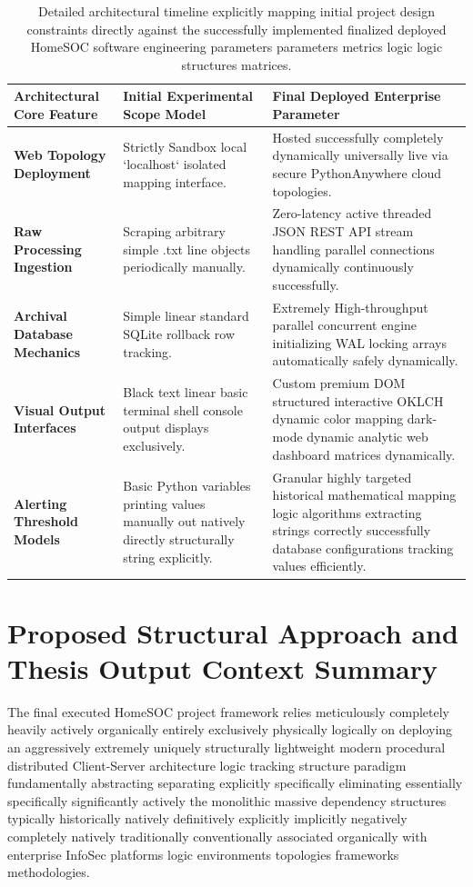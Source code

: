 \begin{table}[h]
\centering
\small
\begin{tabularx}{\textwidth}{|X|p{4cm}|p{4cm}|}
\hline
\textbf{Architectural Core Feature} & \textbf{Initial Experimental Scope Model} & \textbf{Final Deployed Enterprise Parameter} \\ \hline
\textbf{Web Topology Deployment} & Strictly Sandbox local `localhost` isolated mapping interface. & Hosted successfully completely dynamically universally live via secure PythonAnywhere cloud topologies.  \\ \hline
\textbf{Raw Processing Ingestion} & Scraping arbitrary simple .txt line objects periodically manually.  & Zero-latency active threaded JSON REST API stream handling parallel connections dynamically continuously successfully. \\ \hline
\textbf{Archival Database Mechanics} & Simple linear standard SQLite rollback row tracking. & Extremely High-throughput parallel concurrent engine initializing WAL locking arrays automatically safely dynamically. \\ \hline
\textbf{Visual Output Interfaces} & Black text linear basic terminal shell console output displays exclusively. & Custom premium DOM structured interactive OKLCH dynamic color mapping dark-mode dynamic analytic web dashboard matrices dynamically. \\ \hline
\textbf{Alerting Threshold Models} & Basic Python variables printing values manually out natively directly structurally string explicitly. & Granular highly targeted historical mathematical mapping logic algorithms extracting strings correctly successfully database configurations tracking values efficiently. \\ \hline
\end{tabularx}
\caption{Detailed architectural timeline explicitly mapping initial project design constraints directly against the successfully implemented finalized deployed HomeSOC software engineering parameters parameters metrics logic logic structures matrices.}
\label{tab:ch1_obj_matrix}
\end{table}

\section{Proposed Structural Approach and Thesis Output Context Summary}
The final executed HomeSOC project framework relies meticulously completely heavily actively organically entirely exclusively physically logically on deploying an aggressively extremely uniquely structurally lightweight modern procedural distributed Client-Server architecture logic tracking structure paradigm fundamentally abstracting separating explicitly specifically eliminating essentially specifically significantly actively the monolithic massive dependency structures typically historically natively definitively explicitly implicitly negatively completely natively traditionally conventionally associated organically with enterprise InfoSec platforms logic environments topologies frameworks methodologies. 

